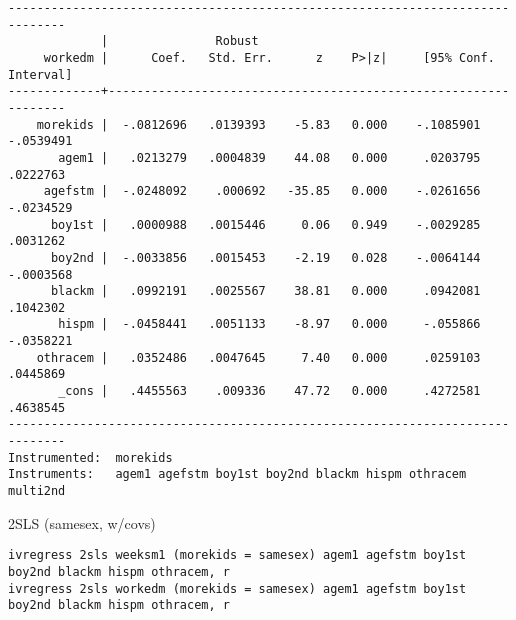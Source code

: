\documentclass[cache=false]{article}
\begin{document}
\begin{verbatim}
------------------------------------------------------------------------------
             |               Robust
     workedm |      Coef.   Std. Err.      z    P>|z|     [95% Conf. Interval]
-------------+----------------------------------------------------------------
    morekids |  -.0812696   .0139393    -5.83   0.000    -.1085901   -.0539491
       agem1 |   .0213279   .0004839    44.08   0.000     .0203795    .0222763
     agefstm |  -.0248092    .000692   -35.85   0.000    -.0261656   -.0234529
      boy1st |   .0000988   .0015446     0.06   0.949    -.0029285    .0031262
      boy2nd |  -.0033856   .0015453    -2.19   0.028    -.0064144   -.0003568
      blackm |   .0992191   .0025567    38.81   0.000     .0942081    .1042302
       hispm |  -.0458441   .0051133    -8.97   0.000     -.055866   -.0358221
    othracem |   .0352486   .0047645     7.40   0.000     .0259103    .0445869
       _cons |   .4455563    .009336    47.72   0.000     .4272581    .4638545
------------------------------------------------------------------------------
Instrumented:  morekids
Instruments:   agem1 agefstm boy1st boy2nd blackm hispm othracem multi2nd
\end{verbatim}

2SLS (samesex, w/covs)
\begin{verbatim}
ivregress 2sls weeksm1 (morekids = samesex) agem1 agefstm boy1st boy2nd blackm hispm othracem, r
ivregress 2sls workedm (morekids = samesex) agem1 agefstm boy1st boy2nd blackm hispm othracem, r
\end{verbatim}
\end{document}
